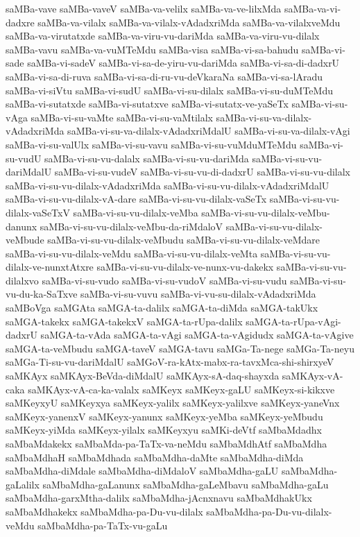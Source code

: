 {saMBa-vave
saMBa-vaveV
saMBa-va-velilx
saMBa-va-ve-lilxMda
saMBa-va-vi-dadxre
saMBa-va-vilalx
saMBa-va-vilalx-vAdadxriMda
saMBa-va-vilalxveMdu
saMBa-va-virutatxde
saMBa-va-viru-vu-dariMda
saMBa-va-viru-vu-dilalx
saMBa-vavu
saMBa-va-vuMTeMdu
saMBa-visa
saMBa-vi-sa-bahudu
saMBa-vi-sade
saMBa-vi-sadeV
saMBa-vi-sa-de-yiru-vu-dariMda
saMBa-vi-sa-di-dadxrU
saMBa-vi-sa-di-ruva
saMBa-vi-sa-di-ru-vu-deVkaraNa
saMBa-vi-sa-lAradu
saMBa-vi-siVtu
saMBa-vi-sudU
saMBa-vi-su-dilalx
saMBa-vi-su-duMTeMdu
saMBa-vi-sutatxde
saMBa-vi-sutatxve
saMBa-vi-sutatx-ve-yaSeTx
saMBa-vi-su-vAga
saMBa-vi-su-vaMte
saMBa-vi-su-vaMtilalx
saMBa-vi-su-va-dilalx-vAdadxriMda
saMBa-vi-su-va-dilalx-vAdadxriMdalU
saMBa-vi-su-va-dilalx-vAgi
saMBa-vi-su-valUlx
saMBa-vi-su-vavu
saMBa-vi-su-vuMduMTeMdu
saMBa-vi-su-vudU
saMBa-vi-su-vu-dalalx
saMBa-vi-su-vu-dariMda
saMBa-vi-su-vu-dariMdalU
saMBa-vi-su-vudeV
saMBa-vi-su-vu-di-dadxrU
saMBa-vi-su-vu-dilalx
saMBa-vi-su-vu-dilalx-vAdadxriMda
saMBa-vi-su-vu-dilalx-vAdadxriMdalU
saMBa-vi-su-vu-dilalx-vA-dare
saMBa-vi-su-vu-dilalx-vaSeTx
saMBa-vi-su-vu-dilalx-vaSeTxV
saMBa-vi-su-vu-dilalx-veMba
saMBa-vi-su-vu-dilalx-veMbu-danunx
saMBa-vi-su-vu-dilalx-veMbu-da-riMdaloV
saMBa-vi-su-vu-dilalx-veMbude
saMBa-vi-su-vu-dilalx-veMbudu
saMBa-vi-su-vu-dilalx-veMdare
saMBa-vi-su-vu-dilalx-veMdu
saMBa-vi-su-vu-dilalx-veMta
saMBa-vi-su-vu-dilalx-ve-nunxtAtxre
saMBa-vi-su-vu-dilalx-ve-nunx-vu-dakekx
saMBa-vi-su-vu-dilalxvo
saMBa-vi-su-vudo
saMBa-vi-su-vudoV
saMBa-vi-su-vudu
saMBa-vi-su-vu-du-ka-SaTxve
saMBa-vi-su-vuvu
saMBa-vi-vu-su-dilalx-vAdadxriMda
saMBoVga
saMGAta
saMGA-ta-dalilx
saMGA-ta-diMda
saMGA-takUkx
saMGA-takekx
saMGA-takekxV
saMGA-ta-rUpa-dalilx
saMGA-ta-rUpa-vAgi-dadxrU
saMGA-ta-vAda
saMGA-ta-vAgi
saMGA-ta-vAgidudx
saMGA-ta-vAgive
saMGA-ta-veMbudu
saMGA-taveV
saMGA-tavu
saMGa-Ta-nege
saMGa-Ta-neyu
saMGa-Ti-su-vu-dariMdalU
saMGoV-ra-kAtx-mabx-ra-tavxMca-shi-shirxyeV
saMKAyx
saMKAyx-BeVda-diMdalU
saMKAyx-sA-daq-shayxda
saMKAyx-vA-caka
saMKAyx-vA-ca-ka-valalx
saMKeyx
saMKeyx-gaLU
saMKeyx-si-kikxve
saMKeyxyU
saMKeyxya
saMKeyx-yalilx
saMKeyx-yalilxve
saMKeyx-yaneVnx
saMKeyx-yanenxV
saMKeyx-yanunx
saMKeyx-yeMba
saMKeyx-yeMbudu
saMKeyx-yiMda
saMKeyx-yilalx
saMKeyxyu
saMKi-deVtf
saMbaMdadhx
saMbaMdakekx
saMbaMda-pa-TaTx-va-neMdu
saMbaMdhAtf
saMbaMdha
saMbaMdhaH
saMbaMdhada
saMbaMdha-daMte
saMbaMdha-diMda
saMbaMdha-diMdale
saMbaMdha-diMdaloV
saMbaMdha-gaLU
saMbaMdha-gaLalilx
saMbaMdha-gaLanunx
saMbaMdha-gaLeMbavu
saMbaMdha-gaLu
saMbaMdha-garxMtha-dalilx
saMbaMdha-jAcnxnavu
saMbaMdhakUkx
saMbaMdhakekx
saMbaMdha-pa-Du-vu-dilalx
saMbaMdha-pa-Du-vu-dilalx-veMdu
saMbaMdha-pa-TaTx-vu-gaLu
}
